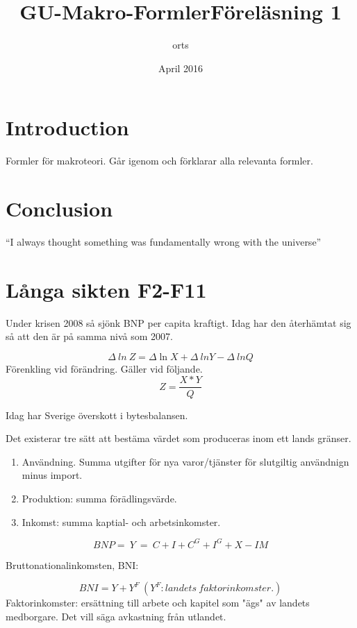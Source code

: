 \documentclass{article}
\title{GU-Makro-Formler}
\author{orts }
\date{April 2016}
\begin{document}
\maketitle

\section{Introduction}
Formler för makroteori. Går igenom och förklarar alla relevanta formler. 



\section{Conclusion}
``I always thought something was fundamentally wrong with the universe'' \citep{adams1995hitchhiker}

\section{Långa sikten F2-F11}
\title{Föreläsning 1}

Under krisen 2008 så sjönk BNP per capita kraftigt. Idag har den återhämtat sig så att den är på samma nivå som 2007. 

$$
    \Delta \ ln \ Z = \Delta \ln  X + \Delta \ ln Y - \Delta \ ln Q
$$
Förenkling vid förändring. Gäller vid följande. 
$$
Z = \frac{X*Y}{Q}
$$

Idag har Sverige överskott i bytesbalansen. 

Det existerar tre sätt att bestäma värdet som produceras inom ett lands gränser. 

\begin{enumerate}
    \item Användning. Summa utgifter för nya varor/tjänster för slutgiltig användnign minus import. 
    \item Produktion: summa förädlingsvärde.
    \item Inkomst: summa kaptial- och arbetsinkomster. 
\end{enumerate}

\begin{equation}
    BNP = \ Y\ = \ C + I + C^G + I^G + X - IM 
\end{equation}

Bruttonationalinkomsten, BNI: 

$$
BNI = Y + Y^F \ (Y^F: landets \ faktorinkomster.) 
$$
Faktorinkomster: ersättning till arbete och kapitel som "ägs" av landets medborgare. Det vill säga avkastning från utlandet. 
\end{document}
